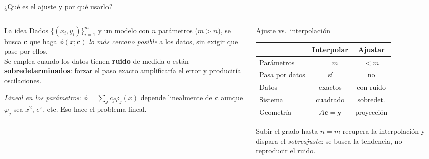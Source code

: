 \documentclass[aspectratio=169,10pt]{beamer}
\begin{document}
\begin{frame}{¿Qué es el ajuste y por qué usarlo?}
\begin{columns}[T]
\begin{column}{0.50\textwidth}
\begin{cardidea}{La idea}{\faLightbulb}
{\footnotesize Dados $\{(x_i,y_i)\}_{i=1}^m$ y un modelo con $n$ parámetros ($m>n$), se busca $\mathbf c$ que haga $\phi(x;\mathbf c)$ \emph{lo más cercano posible} a los datos, sin exigir que pase por ellos.\\[1.0mm]
Se emplea cuando los datos tienen \textbf{ruido} de medida o están \textbf{sobredeterminados}: forzar el paso exacto amplificaría el error y produciría oscilaciones.}
\end{cardidea}
\vspace{1mm}
\begin{cardnota}[\faInfoCircle]
{\footnotesize \emph{Lineal en los parámetros}: $\phi=\sum_j c_j\varphi_j(x)$ depende linealmente de $\mathbf c$ aunque $\varphi_j$ sea $x^2$, $e^x$, etc. Eso hace el problema lineal.}
\end{cardnota}
\end{column}
\begin{column}{0.48\textwidth}
\begin{cardgear}{Ajuste vs.\ interpolación}{\faTable}
\centering
{\footnotesize\renewcommand{\arraystretch}{1.18}\setlength{\tabcolsep}{5pt}
\begin{tabular}{l|cc}
 & Interpolar & Ajustar\\\hline
Parámetros & $=m$ & $<m$\\
Pasa por datos & sí & no\\
Datos & exactos & con ruido\\
Sistema & cuadrado & sobredet.\\
Geometría & $A\mathbf c=\mathbf y$ & proyección\\
\end{tabular}}
\end{cardgear}
\vspace{1mm}
\begin{cardnota}[\faExclamationTriangle]
{\footnotesize Subir el grado hasta $n=m$ recupera la interpolación y dispara el \emph{sobreajuste}: se busca la tendencia, no reproducir el ruido.}
\end{cardnota}
\end{column}
\end{columns}
\end{frame}
\end{document}
